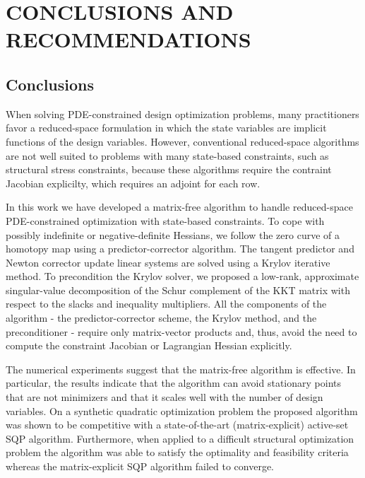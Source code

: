  
\chapter{CONCLUSIONS AND RECOMMENDATIONS}\label{chap:con}

\section{Conclusions}
When solving PDE-constrained design optimization problems, many practitioners
favor a reduced-space formulation in which the state variables are implicit
functions of the design variables.  However, conventional reduced-space
algorithms are not well suited to problems with many state-based constraints, 
such as structural stress constraints, 
because these algorithms require the contraint Jacobian explicilty, which
requires an adjoint for each row.

In this work we have developed a matrix-free algorithm to handle reduced-space
PDE-constrained optimization with state-based constraints.  To cope with
possibly indefinite or negative-definite Hessians, we follow the zero curve of a homotopy map using a
predictor-corrector algorithm.  The tangent predictor and Newton corrector update linear systems are
solved using a Krylov iterative method.  To precondition the Krylov solver, we
proposed a low-rank, approximate singular-value decomposition of the Schur
complement of the KKT matrix with respect to the slacks and inequality multipliers.  All
the components of the algorithm - the predictor-corrector scheme, the Krylov
method, and the preconditioner - require only matrix-vector products and,
thus, avoid the need to compute the constraint Jacobian or Lagrangian Hessian
explicitly.

The numerical experiments suggest that the matrix-free algorithm is effective.
In particular, the results indicate that the algorithm can avoid stationary
points that are not minimizers and that it scales well with the number of design
variables.  On a synthetic quadratic optimization problem the proposed algorithm
was shown to be competitive with a state-of-the-art (matrix-explicit) active-set
SQP algorithm.  Furthermore, when applied to a difficult structural optimization
problem the algorithm was able to satisfy the optimality and feasibility
criteria whereas the matrix-explicit SQP algorithm failed to converge. 

